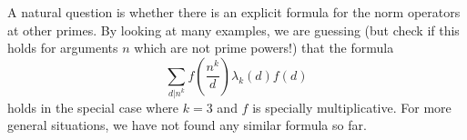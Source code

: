 \documentclass[a4paper]{article}
\begin{document}
\begin{remark}
A natural question is whether there is an explicit formula for the norm operators at other primes. By looking at many examples, we are guessing (but check if this holds for arguments $n$ which are not prime powers!) that the formula 
$$ \sum_{d \vert n^k} f(\frac{n^k}{d}) \lambda_k(d) f(d)  $$
holds in the special case where $k=3$ and $f$ is specially multiplicative. For more general situations, we have not found any similar formula so far. 
\end{remark}



\newpage
\appendix






\end{document}
